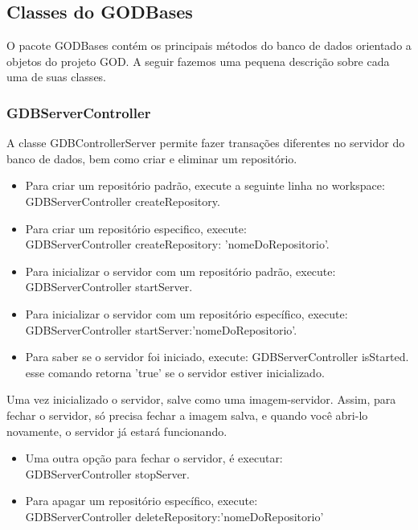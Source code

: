 \documentclass[a4paper, 10pt]{article}
\begin{document}
\begin{newpage}
\subsection{ Classes do GODBases}
O pacote GODBases contém os principais métodos do banco de dados orientado a objetos do projeto GOD. A seguir fazemos uma pequena descrição sobre cada uma de suas classes.

\subsubsection{GDBServerController}

A classe GDBControllerServer permite fazer transações diferentes no servidor do banco de dados, bem como criar e eliminar um repositório. 

\begin{itemize}
\item Para criar um repositório padrão, execute a seguinte linha no workspace:\\
 { GDBServerController createRepository.}
\item Para criar um repositório especifico, execute:\\
{GDBServerController createRepository: 'nomeDoRepositorio'.}
\item Para inicializar o servidor com um repositório padrão, execute:\\
{GDBServerController startServer.}
\item Para inicializar o servidor com um repositório específico, execute:\\
{GDBServerController startServer:'nomeDoRepositorio'.}
\item{Para saber se o servidor foi iniciado, execute:}
{GDBServerController isStarted.}\\
esse comando retorna 'true' se o servidor estiver inicializado.
\end{itemize}

Uma vez inicializado o servidor, salve como uma imagem-servidor. Assim, para fechar o servidor, só precisa fechar a imagem salva, e quando você abri-lo novamente, o servidor já estará funcionando.

\begin{itemize}
\item Uma outra opção para fechar o servidor, é executar:\\
{GDBServerController stopServer.}
\item Para apagar um repositório específico, execute:\\
{GDBServerController deleteRepository:'nomeDoRepositorio'}
\end{itemize}



\end{newpage}
\end{document}
